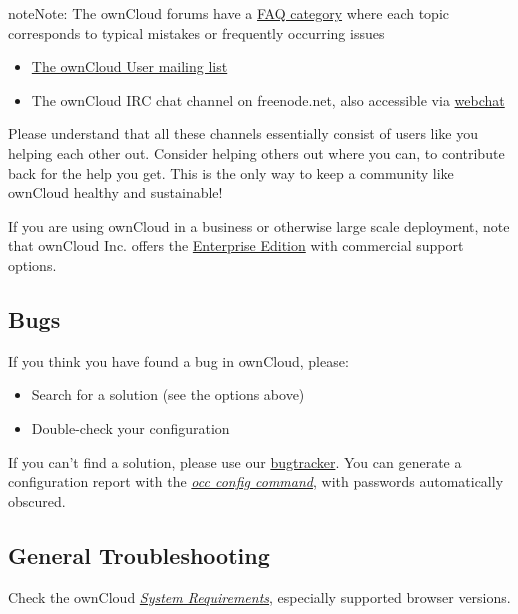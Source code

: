 \documentclass[letterpaper,10pt,english]{sphinxmanual}
\begin{document}
\begin{notice}{note}{Note:}
The ownCloud forums have a \href{https://central.owncloud.org/c/faq}{FAQ category} where each topic corresponds
to typical mistakes or frequently occurring issues
\end{notice}
\begin{itemize}
\item {} 
\href{https://mailman.owncloud.org/mailman/listinfo/user}{The ownCloud User mailing list}

\item {} 
The ownCloud IRC chat channel  on
freenode.net, also accessible via \href{http://webchat.freenode.net/?channels=owncloud}{webchat}

\end{itemize}

Please understand that all these channels essentially consist of users like you
helping each other out. Consider helping others out where you can, to contribute
back for the help you get. This is the only way to keep a community like
ownCloud healthy and sustainable!

If you are using ownCloud in a business or otherwise large scale deployment,
note that ownCloud Inc. offers the \href{https://owncloud.com/lp/community-or-enterprise/}{Enterprise Edition} with commercial
support options.


\subsection{Bugs}
\label{issues/general_troubleshooting:bugs}
If you think you have found a bug in ownCloud, please:
\begin{itemize}
\item {} 
Search for a solution (see the options above)

\item {} 
Double-check your configuration

\end{itemize}

If you can't find a solution, please use our \href{https://doc.owncloud.org/server/9.2/developer\_manual/bugtracker/index.html}{bugtracker}. You can generate a
configuration report with the {\hyperref[configuration_server/occ_command:config\string-commands\string-label]{\emph{occ config command}}}, with passwords automatically obscured.


\subsection{General Troubleshooting}
\label{issues/general_troubleshooting:id1}
Check the ownCloud {\hyperref[installation/system_requirements::doc]{\emph{\emph{System Requirements}}}}, especially
supported browser versions.
\end{document}
